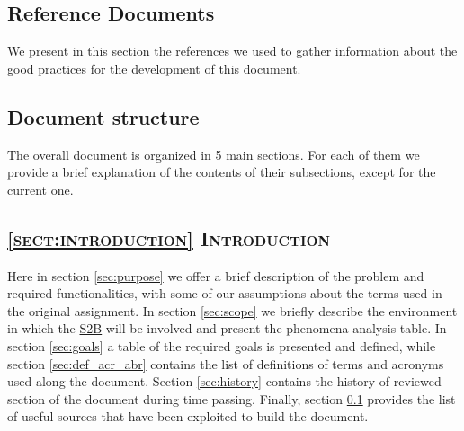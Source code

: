 \subsection{Reference Documents}
\label{sec:ref_docs}
We present in this section the references we used to gather information about the good practices for the development of this document.
\begingroup
\renewcommand{\section}[2]{}%
\nocite{*}


\endgroup





\subsection{Document structure}
\label{sec:doc_struct}
The overall document is organized in 5 main sections. For each of them we provide a brief explanation of the contents of their subsections, except for the current one.

\subsection*{\textsc{\textcolor{myblue}{\ref{sect:introduction} Introduction}}}
Here in section \ref{sec:purpose} we offer a brief description of the problem and required functionalities, with some of our assumptions about the terms used in the original assignment. In section \ref{sec:scope} we briefly describe the environment in which the \hyperref[tab:def]{S2B} will be involved and present the phenomena analysis table.
In section \ref{sec:goals} a table of the required goals is presented and defined, while section \ref{sec:def_acr_abr} contains the list of definitions of terms and acronyms used along the document. Section \ref{sec:history} contains the history of reviewed section of the document during time passing. Finally, section \ref{sec:ref_docs} provides the list of useful sources that have been exploited to build the document.

